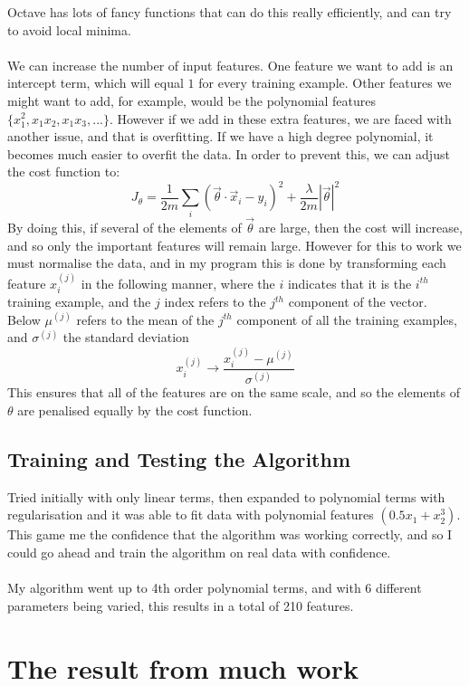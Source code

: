 \documentclass[a4paper,12pt]{report}
\begin{document}
Octave has lots of fancy functions that can do this really efficiently, and can try to avoid local minima.
\\\\
We can increase the number of input features. One feature we want to add is an intercept term, which will equal $1$ for every training example. Other features we might want to add, for example, would be the polynomial features $\{x_1^2,x_1x_2,x_1x_3, ... \}$. However if we add in these extra features, we are faced with another issue, and that is overfitting. If we have a high degree polynomial, it becomes much easier to overfit the data. In order to prevent this, we can adjust the cost function to:
$$J_\theta = \frac{1}{2m}\sum_i \left(\vec\theta\cdot \vec x_i -y_i\right)^2 +\frac{\lambda}{2m} |\vec\theta|^2$$
By doing this, if several of the elements of $\vec \theta$ are large, then the cost will increase, and so only the important features will remain large. However for this to work we must normalise the data, and in my program this is done by transforming each feature $x_i^{(j)}$  in the following manner, where the $i$ indicates that it is the $i^{th}$ training example, and the $j$ index refers to the $j^{th}$ component of the vector. Below $\mu^{(j)}$ refers to the mean of the $j^{th}$ component of all the training examples, and $\sigma^{(j)}$ the standard deviation
$$x_i^{(j)}\rightarrow \frac{x_i^{(j)}-\mu^{(j)}}{\sigma^{(j)}}$$
This ensures that all of the features are on the same scale, and so the elements of $\theta$ are penalised equally by the cost function. 



\section{Training and Testing the Algorithm}

Tried initially with only linear terms, then expanded to polynomial terms with regularisation and it was able to fit data with polynomial features $(0.5x_1+x_2^3)$. This game me the confidence that the algorithm was working correctly, and so I could go ahead and train the algorithm on real data with confidence.\\\\
My algorithm went up to 4th order polynomial terms, and with 6 different parameters being varied, this results in a total of 210 features. 




\chapter{The result from much work}
\end{document}
